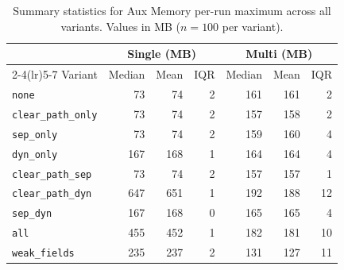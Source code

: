 \begin{table}[t]
\centering
\caption{Summary statistics for Aux Memory per-run maximum across all variants. Values in MB ($n=100$ per variant).}
\label{tab:stats-memory-aux}
\begin{tabular}{l rrr rrr}
\toprule
 & \multicolumn{3}{c}{Single (MB)} & \multicolumn{3}{c}{Multi (MB)} \\
\cmidrule(lr){2-4}\cmidrule(lr){5-7}
Variant & Median & Mean & IQR & Median & Mean & IQR \\
\midrule
\texttt{none} & 73 & 74 & 2 & 161 & 161 & 2 \\
\texttt{clear\_path\_only} & 73 & 74 & 2 & 157 & 158 & 2 \\
\texttt{sep\_only} & 73 & 74 & 2 & 159 & 160 & 4 \\
\texttt{dyn\_only} & 167 & 168 & 1 & 164 & 164 & 4 \\
\texttt{clear\_path\_sep} & 73 & 74 & 2 & 157 & 157 & 1 \\
\texttt{clear\_path\_dyn} & 647 & 651 & 1 & 192 & 188 & 12 \\
\texttt{sep\_dyn} & 167 & 168 & 0 & 165 & 165 & 4 \\
\texttt{all} & 455 & 452 & 1 & 182 & 181 & 10 \\
\texttt{weak\_fields} & 235 & 237 & 2 & 131 & 127 & 11 \\
\bottomrule
\end{tabular}
\end{table}
